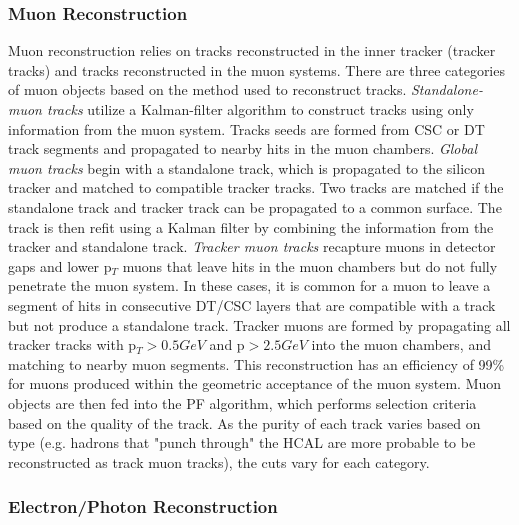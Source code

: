 \subsubsection{Muon Reconstruction} \label{sec:CMS_Reco_mu}
Muon reconstruction relies on tracks reconstructed in the inner tracker (tracker tracks) and tracks reconstructed in the muon systems. There are three categories of muon objects based on the method used to reconstruct tracks.
\textit{Standalone-muon tracks} utilize a Kalman-filter algorithm to construct tracks using only information from the muon system. Tracks seeds are formed from CSC or DT track segments and propagated to nearby hits in the muon chambers.
\textit{Global muon tracks} begin with a standalone track, which is propagated to the silicon tracker and matched to compatible tracker tracks. Two tracks are matched if the standalone track and tracker track can be propagated to a common surface. The track is then refit using a Kalman filter by combining the information from the tracker and standalone track.
\textit{Tracker muon tracks} recapture muons in detector gaps and lower p$_T$ muons that leave hits in the muon chambers but do not fully penetrate the muon system. In these cases, it is common for a muon to leave a segment of hits in consecutive DT/CSC layers that are compatible with a track but not produce a standalone track. Tracker muons are formed by propagating all tracker tracks with p$_T > 0.5\unit{GeV}$ and p$>2.5\unit{GeV}$ into the muon chambers, and matching to nearby muon segments.
This reconstruction has an efficiency of 99\% for muons produced within the geometric acceptance of the muon system\cite{Sirunyan:2313130}. Muon objects are then fed into the PF algorithm, which performs selection criteria based on the quality of the track. As the purity of each track varies based on type (e.g. hadrons that "punch through" the HCAL are more probable to be reconstructed as track muon tracks), the cuts vary for each category.

\subsubsection{Electron/Photon Reconstruction} \label{sec:CMS_reco_egamma}

